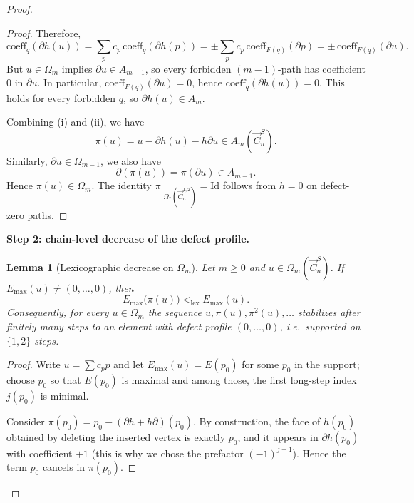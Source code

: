 \documentclass[11pt]{amsart}
\theoremstyle{plain}
\newtheorem{lemma}[theorem]{Lemma}
\theoremstyle{definition}
\numberwithin{equation}{section}
\begin{document}
\begin{proof}
\begin{proof}
Therefore,
\[
\mathrm{coeff}_q(\partial h(u))
=\sum_{p} c_p\,\mathrm{coeff}_q(\partial h(p))
=\pm\sum_{p} c_p\,\mathrm{coeff}_{F(q)}(\partial p)
=\pm\,\mathrm{coeff}_{F(q)}(\partial u).
\]
But $u\in\Omega_m$ implies $\partial u\in A_{m-1}$, so every forbidden $(m-1)$-path has coefficient $0$ in $\partial u$.
In particular, $\mathrm{coeff}_{F(q)}(\partial u)=0$, hence $\mathrm{coeff}_q(\partial h(u))=0$.
This holds for every forbidden $q$, so $\partial h(u)\in A_m$.

\medskip
Combining (i) and (ii), we have
\[
\pi(u)=u-\partial h(u)-h\partial u\in A_m(\vec{C}_n^S).
\]
Similarly, $\partial u\in\Omega_{m-1}$, we also have
\[\partial(\pi(u))=\pi(\partial u)\in A_{m-1}.\] 
Hence $\pi(u)\in\Omega_m$.
The identity $\pi|_{\Omega_*(\vec{C}_n^{1,2})}=\mathrm{Id}$ follows from $h=0$ on defect-zero paths.
\end{proof}

\noindent\textbf{Step 2: chain-level decrease of the defect profile.}

\begin{lemma}[Lexicographic decrease on $\Omega_m$]
Let $m\ge 0$ and $u\in\Omega_m(\vec{C}_n^S)$.  If $E_{\max}(u)\neq (0,\dots,0)$, then
\[
E_{\max}\bigl(\pi(u)\bigr) <_{\mathrm{lex}} E_{\max}(u).
\]
Consequently, for every $u\in\Omega_m$ the sequence $u,\pi(u),\pi^2(u),\dots$ stabilizes after finitely many steps
to an element with defect profile $(0,\dots,0)$, i.e.\ supported on $\{1,2\}$-steps.
\end{lemma}

\begin{proof}
Write $u=\sum c_p p$ and let $E_{\max}(u)=E(p_0)$ for some $p_0$ in the support; choose $p_0$ so that
$E(p_0)$ is maximal and among those, the first long-step index $j(p_0)$ is minimal.

Consider $\pi(p_0)=p_0-(\partial h+h\partial)(p_0)$.  By construction, the face of $h(p_0)$ obtained by deleting the inserted
vertex is exactly $p_0$, and it appears in $\partial h(p_0)$ with coefficient $+1$ (this is why we chose the prefactor
$(-1)^{j+1}$).  Hence the term $p_0$ cancels in $\pi(p_0)$.


\end{proof}
\end{proof}
\end{document}
